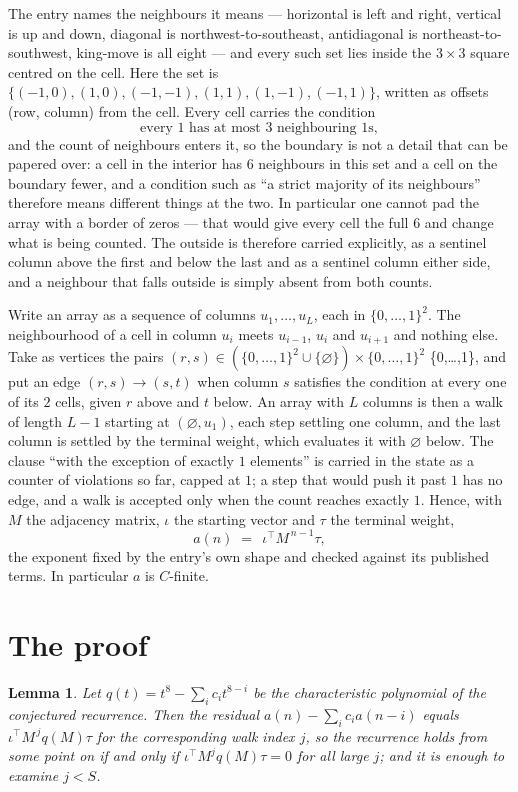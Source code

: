 \documentclass[11pt,a4paper]{article}
\theoremstyle{plain}
\newtheorem{lemma}[theorem]{Lemma}
\theoremstyle{definition}
\begin{document}
The entry names the neighbours it means --- horizontal is left and right, vertical is up and
down, diagonal is northwest-to-southeast, antidiagonal is northeast-to-southwest, king-move is
all eight --- and every such set lies inside the $3\times3$ square centred on the cell. Here
the set is $\{(-1,0), (1,0), (-1,-1), (1,1), (1,-1), (-1,1)\}$, written as offsets (row, column) from the cell. Every cell carries
the condition
\[
\text{every 1 has at most 3 neighbouring 1s},
\]
and the count of neighbours enters it, so the boundary is not a detail that can be papered
over: a cell in the interior has $6$ neighbours in this set and a cell on the boundary
fewer, and a condition such as ``a strict majority of its neighbours'' therefore means
different things at the two. In particular one cannot pad the array with a border of zeros ---
that would give every cell the full $6$ and change what is being counted. The outside is
therefore carried
explicitly, as a sentinel column above the first and below the last and as a sentinel column
either side, and a neighbour that falls outside is simply absent from both counts.

Write an array as a sequence of columns $u_1,\dots,u_L$, each in
$\{0,\dots,1\}^{2}$. The neighbourhood of a cell in column $u_i$ meets $u_{i-1}$,
$u_i$ and $u_{i+1}$ and nothing else. Take as vertices the pairs
$(r,s)\in(\{0,\dots,1\}^{2}\cup\{\varnothing\})\times\{0,\dots,1\}^{2}$ \times \{0,\dots,1\},
and put an edge $(r,s)\to(s,t)$ when column $s$ satisfies the condition at every one of its
$2$ cells, given $r$ above and $t$ below. An array with $L$ columns is then a walk of length
$L-1$ starting at $(\varnothing,u_1)$, each step settling one column, and the last column is
settled by the terminal weight, which evaluates it with $\varnothing$ below. The clause ``with the exception of exactly $1$ elements'' is carried in
the state as a counter of violations so far, capped at $1$; a step that would push it past
$1$ has no edge, and a walk is accepted only when the count reaches exactly $1$. Hence,
with $M$ the adjacency matrix, $\iota$ the starting vector and $\tau$ the terminal weight,
\[
a(n)\;=\;\,\iota^{\!\top}M^{\,n-1}\tau ,
\]
the exponent fixed by the entry's own shape and checked against its published terms. In
particular $a$ is $C$-finite.

\section{The proof}

\begin{lemma}\label{lem:crit}
Let $q(t)=t^{8}-\sum_i c_it^{8-i}$ be the characteristic polynomial of the
conjectured recurrence. Then the residual $a(n)-\sum_ic_ia(n-i)$ equals
$\iota^{\!\top}M^{\,j}q(M)\tau$ for the corresponding walk index $j$, so the
recurrence holds from some point on if and only if $\iota^{\!\top}M^{j}q(M)\tau=0$ for all
large $j$; and it is enough to examine $j<S$.
\end{lemma}
\end{document}
